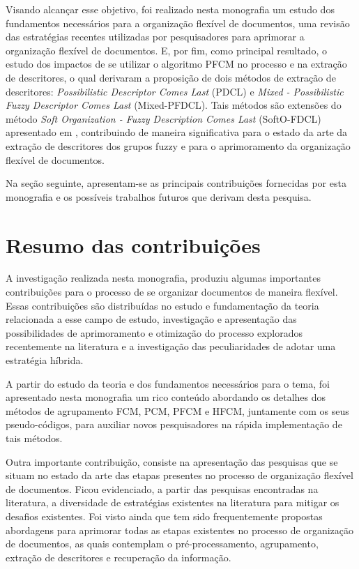Visando alcançar esse objetivo, foi realizado nesta monografia um estudo dos fundamentos
necessários para a organização flexível de documentos, uma revisão das estratégias recentes
utilizadas por pesquisadores para aprimorar a organização flexível de documentos. E, por fim, como
principal resultado, o estudo dos impactos de se utilizar o algoritmo PFCM no processo e na extração de
descritores, o qual derivaram a proposição de dois métodos de extração de descritores: {\it Possibilistic Descriptor Comes Last\/} (PDCL) e {\it Mixed - Possibilistic Fuzzy Descriptor Comes Last\/} (Mixed-PFDCL). Tais métodos são extensões do método {\it Soft Organization - Fuzzy Description Comes Last} (SoftO-FDCL) apresentado em \cite{Nogueira2013},
contribuindo de maneira significativa para o estado da arte da extração de descritores dos grupos
fuzzy e para o aprimoramento da organização flexível de documentos.

Na seção seguinte, apresentam-se as principais contribuições fornecidas por esta monografia e os
possíveis trabalhos futuros que derivam desta pesquisa.

\section{Resumo das contribuições}

A investigação realizada nesta monografia, produziu algumas importantes contribuições para o
processo de se organizar documentos de maneira flexível. Essas contribuições são distribuídas no estudo e
fundamentação da teoria relacionada a esse campo de estudo, investigação e apresentação das
possibilidades de aprimoramento e otimização do processo explorados recentemente na literatura e a
investigação das peculiaridades de adotar uma estratégia híbrida.

A partir do estudo da teoria e dos fundamentos necessários para o tema, foi apresentado nesta
monografia um rico conteúdo abordando os detalhes dos métodos de agrupamento FCM, PCM, PFCM e HFCM,
juntamente com os seus pseudo-códigos, para auxiliar novos pesquisadores na rápida implementação de
tais métodos.

Outra importante contribuição, consiste na apresentação das pesquisas que se situam no estado da
arte das etapas presentes no processo de organização flexível de documentos. Ficou evidenciado, a
partir das pesquisas encontradas na literatura, a diversidade de estratégias existentes na literatura
para mitigar os desafios existentes. Foi visto ainda que tem sido frequentemente propostas abordagens para aprimorar todas
as etapas existentes no processo de organização de documentos, as quais contemplam o pré-processamento, agrupamento, extração
de descritores e recuperação da informação.

